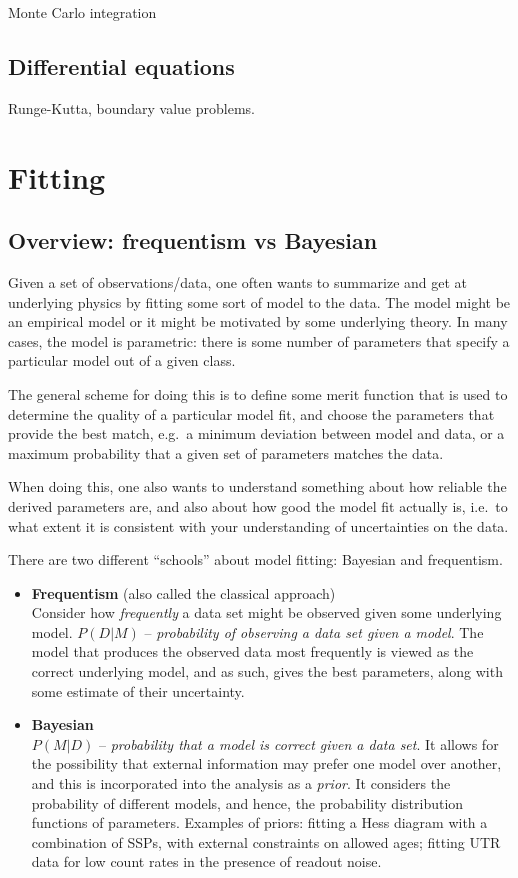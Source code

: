 \documentclass[12pt]{article}
\begin{document}
Monte Carlo integration

\subsection{Differential equations}
Runge-Kutta, boundary value problems.


\newpage
\section{Fitting}

\subsection{Overview: frequentism vs Bayesian}
Given a set of observations/data, one often wants to summarize and get at
underlying physics by fitting some sort of model to the data. The model
might be an empirical model or it might be motivated by some underlying
theory. In many cases, the model is parametric: there is some number of
parameters that specify a particular model out of a given class.

The general scheme for doing this is to define some merit function that is
used to determine the quality of a particular model fit, and choose the
parameters that provide the best match, e.g.\ a minimum deviation between
model and data, or a maximum probability that a given set of parameters
matches the data.

When doing this, one also wants to understand something about how reliable
the derived parameters are, and also about how good the model fit actually is,
i.e.\ to what extent it is consistent with your understanding of
uncertainties on the data.

There are two different ``schools'' about model fitting: Bayesian and
frequentism.

\begin{itemize}
    \item \textbf{Frequentism} (also called the classical approach) \\
        Consider how \emph{frequently} a data set might be observed given
        some underlying model. \textbf{$P(D|M)$} -- \emph{probability of
        observing a data set given a model}. The model that
        produces the observed data most frequently is viewed as the correct
        underlying model, and as such, gives the best parameters, along
        with some estimate of their uncertainty.
    \item \textbf{Bayesian} \\
        \textbf{$P(M|D)$} -- \emph{probability that a model is correct
        given a data set}.
        It allows for the possibility that external information may prefer
        one model over another, and this is incorporated into the analysis
        as a \emph{prior}. It considers the probability of different models,
        and hence, the probability distribution functions of parameters.
        Examples of priors: fitting a Hess diagram with a combination of
        SSPs, with external constraints on allowed ages; fitting UTR data
        for low count rates in the presence of readout noise.
\end{itemize}
\end{document}
